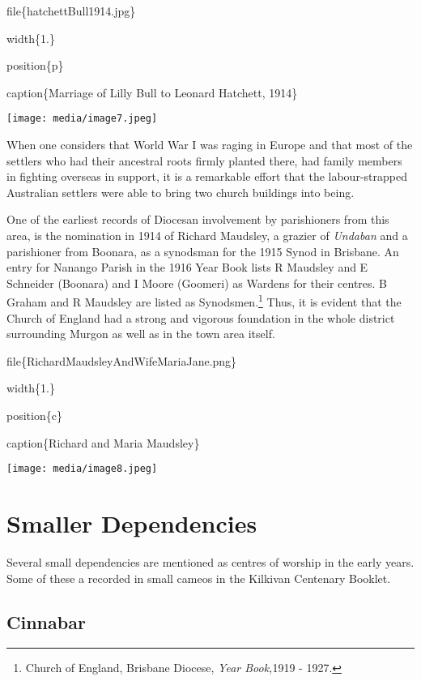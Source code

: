 file\{hatchettBull1914.jpg\}

width\{1.\}

position\{p\}

caption\{Marriage of Lilly Bull to Leonard Hatchett, 1914\}

\texttt{[image: media/image7.jpeg]}

When one considers that World War I was raging in Europe and that most of the settlers who had their ancestral roots firmly planted there, had family members in fighting overseas in support, it is a remarkable effort that the labour-strapped Australian settlers were able to bring two church buildings into being.

One of the earliest records of Diocesan involvement by parishioners from this area, is the nomination in 1914 of Richard Maudsley, a grazier of \emph{Undaban} and a parishioner from Boonara, as a synodsman for the 1915 Synod in Brisbane. An entry for Nanango Parish in the 1916 Year Book lists R Maudsley and E Schneider (Boonara) and I Moore (Goomeri) as Wardens for their centres. B Graham and R Maudsley are listed as Synodsmen.\footnote{Church of England, Brisbane Diocese, \emph{Year Book,}1919 - 1927.} Thus, it is evident that the Church of England had a strong and vigorous foundation in the whole district surrounding Murgon as well as in the town area itself.

file\{RichardMaudsleyAndWifeMariaJane.png\}

width\{1.\}

position\{c\}

caption\{Richard and Maria Maudsley\}

\texttt{[image: media/image8.jpeg]}

\hypertarget{smaller-dependencies}{%
\section{Smaller Dependencies}\label{smaller-dependencies}}

Several small dependencies are mentioned as centres of worship in the early years. Some of these a recorded in small cameos in the Kilkivan Centenary Booklet.

\hypertarget{cinnabar}{%
\subsection{Cinnabar}\label{cinnabar}}

